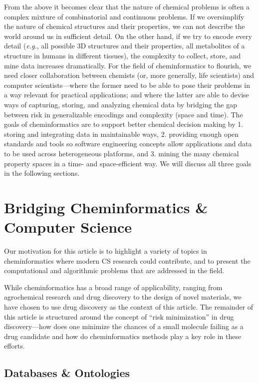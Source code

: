 \documentclass{sig-alternate}
\begin{document}
From the above it becomes clear that the nature of chemical problems
is often a complex mixture of combinatorial and continuous
problems. If we oversimplify the nature of chemical structures and
their properties, we can not describe the world around us in
sufficient detail. On the other hand, if we try to encode every detail
(\emph{e.g.}, all possible 3D structures and their properties, all
metabolites of a structure in humans in different tissues), the
complexity to collect, store, and mine data increases
dramatically. For the field of cheminformatics to flourish, we need
closer collaboration between chemists (or, more generally, life
scientists) and computer scientists---where the former need to be able
to pose their problems in a way relevant for practical applications;
and where the latter are able to devise ways of capturing, storing,
and analyzing chemical data by bridging the gap between risk in
generalizable encodings and complexity (space and time). The goals of cheminformatics are to
support better chemical decision making by 1. storing and integrating
data in maintainable ways, 2.  providing enough open standards and
tools so software engineering concepts allow applications and data to
be used across heterogeneous platforms, and 3. mining the many
chemical property spaces in a time- and space-efficient way. We will
discuss all three goals in the following sections.

\section{Bridging Cheminformatics \& Computer Science}

Our motivation for this article is to highlight a variety of topics in
cheminformatics where modern CS research could contribute, and
to present the computational and algorithmic problems
that are addressed in the field.

While cheminformatics has a broad range of applicability, ranging from
agrochemical research and drug discovery to the design of novel
materials, we have chosen to use drug discovery as the context of this
article. The remainder of this article is structured around the
concept of ``risk minimization'' in drug discovery---how does one
minimize the chances of a small molecule failing as a drug candidate
and how do cheminformatics methods play a key role in these efforts.

\subsection{Databases \& Ontologies}
\end{document}
